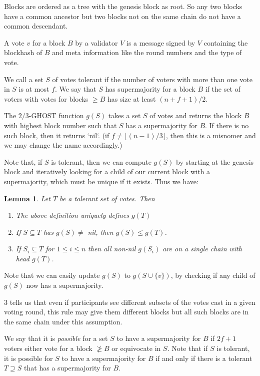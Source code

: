 \documentclass{article}
\newtheorem{lemma}[theorem]{Lemma}
\begin{document}
Blocks are ordered as a tree with the genesis block as root. So any two blocks have a common ancestor but two blocks not on the same chain do not have a common descendant.

A vote $v$ for a block $B$ by a validator $V$ is a message signed by $V$ containing the blockhash of $B$ and meta information like the round numbers and the type of vote. 

We call a set $S$ of votes tolerant if the number of voters with more than one vote in $S$ is at most $f$. We say that $S$ has supermajority for a block $B$ if the set of voters with votes for blocks $\geq B$ has size at least $(n+f+1)/2$.

The $2/3$-GHOST function $g(S)$ takes a set $S$ of votes and returns the block $B$ with highest block number such that $S$ has a supermajority for $B$.
If there is no such block, then it returns `nil`. (if $f \neq \lfloor (n-1)/3 \rfloor$, then this is a misnomer and we may change the name accordingly.)

Note that, if $S$ is tolerant, then we can compute $g(S)$ by starting at the genesis block and iteratively looking for a child of our current block with a supermajority, which must be unique if it exists. Thus we have:
\begin{lemma} \label{lem:ghost-monotonicity}
Let $T$ be a tolerant set of votes. Then
\begin{enumerate}
\item The above definition uniquely defines $g(T)$
\item If $S \subseteq T$ has $g(S) \neq$ nil, then $g(S) \leq g(T)$.
\item If $S_i \subseteq T$ for $1 \leq i \leq n$ then all non-nil $g(S_i)$ are on a single chain with head $g(T)$.
\end{enumerate}

\end{lemma}

Note that we can easily update $g(S)$ to $g(S \cup \{v\})$, by checking if any child of $g(S)$ now has a supermajority.

3 tells us that even if participants see different subsets of the votes cast in a given voting round, this rule may give them different blocks but all such blocks are in the same chain under this assumption. 

We say that it is {\em possible} for a set $S$ to have a supermajority for $B$ if $2f+1$ voters either vote for a block $\not \geq B$ or equivocate in $S$.
Note that if $S$ is tolerant, it is possible for $S$ to have a supermajority for $B$ if and only if there is a tolerant $T \supseteq S$ that has a supermajority for $B$.
\end{document}
